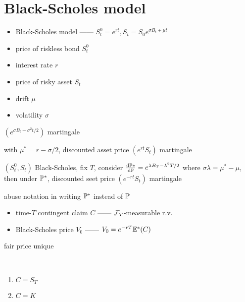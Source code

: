\section{Black-Scholes model}\label{sec:black-scholes-model}

\begin{itemize}
    \item Black-Scholes model ------ $S_t^0 = e^{rt}, S_t = S_0 e^{\sigma B_t + \mu t}$
    \item price of riskless bond $S_t^0$
    \item interest rate $r$
    \item price of risky asset $S_t$
    \item drift $\mu$
    \item volatility $\sigma$
\end{itemize}

\begin{fact}
    $(e^{\sigma B_t - \sigma^2 t/2})$ martingale
\end{fact}

\begin{fact}
    with $\mu^* = r - \sigma/2$, discounted asset price $(e^{rt}S_t)$ martingale
\end{fact}

\begin{prop}
    $(S_t^0, S_t)$ Black-Scholes, fix $T$, consider $\dv{\mathbb{P}*}{\mathbb{P}} = e^{\lambda B_T - \lambda^{2}T/2}$ where $\sigma \lambda = \mu^* - \mu$, then
    under $\mathbb{P}^*$, discounted seet price $(e^{-rt}S_t)$ martingale
\end{prop}

\begin{fact}
    abuse notation in writing $\mathbb{P}^*$ instead of $\mathbb{P}$
\end{fact}

\begin{itemize}
    \item time-$T$ contingent claim $C$ ------ $\mathcal{F}_T$-measurable r.v.
    \item Black-Scholes price $V_0$ ------ $V_0 = e^{-rT}\mathbb{E}^*(C)$
\end{itemize}

\begin{fact}
    fair price unique
\end{fact}

\begin{example}\,
    \begin{enumerate}
        \item $C = S_T$
        \item $C = K$
    \end{enumerate}
\end{example}

